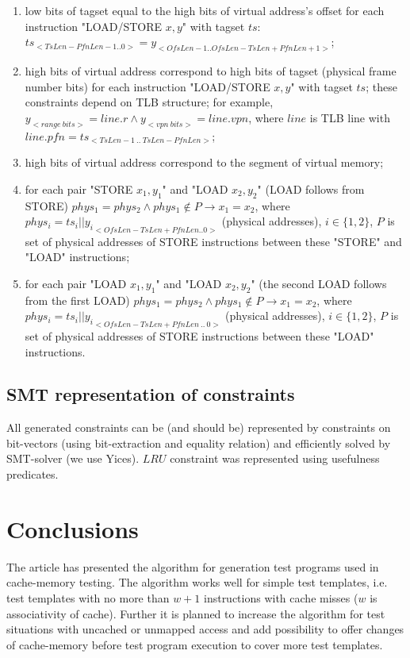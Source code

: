 \documentclass[times, 10pt,twocolumn]{article}
\begin{document}
\begin{enumerate}

\item low bits of tagset equal to the high bits of virtual address's offset for each
instruction "LOAD/STORE $x, y$" with tagset $ts$:
$ts_{<TsLen-PfnLen-1..0>} = y_{<OfsLen-1..OfsLen-TsLen+PfnLen+1>}$;

\item high bits of virtual address correspond to high bits of tagset
(physical frame number bits) for each instruction "LOAD/STORE $x,
y$" with tagset $ts$; these constraints depend on TLB structure; for
example, $y_{<range~bits>} = line.r \wedge y_{<vpn~bits>} =
line.vpn$, where $line$ is TLB line with $line.pfn =
ts_{<TsLen-1~..~TsLen-PfnLen>}$;

\item high bits of virtual address correspond to the segment of virtual memory;

\item for each pair "STORE $x_1, y_1$"
and "LOAD $x_2, y_2$" (LOAD follows from STORE) $phys_1 = phys_2
\wedge phys_1 \notin P \rightarrow x_1 = x_2$, where $phys_i = ts_i
|| {y_i}_{<OfsLen-TsLen+PfnLen..0>}$ (physical addresses), $i \in
\{1, 2\}$, $P$ is set of physical addresses of STORE instructions
between these "STORE" and "LOAD" instructions;

\item for each pair "LOAD
$x_1, y_1$" and "LOAD $x_2, y_2$" (the second LOAD follows from the
first LOAD) $phys_1 = phys_2 \wedge phys_1 \notin P \rightarrow x_1
= x_2$, where $phys_i = ts_i || {y_i}_{<OfsLen-TsLen+PfnLen~..~0>}$
(physical addresses), $i \in \{1, 2\}$, $P$ is set of physical
addresses of STORE instructions between these "LOAD" instructions.
\end{enumerate}

\subsection{SMT representation of constraints}
All generated constraints can be (and should be) represented by constraints on bit-vectors (using bit-extraction and equality relation) and efficiently solved by SMT-solver (we use Yices). $LRU$ constraint was represented using usefulness predicates.

\section{Conclusions}
The article has presented the algorithm for generation test programs used in cache-memory testing. The algorithm works well for simple test templates, i.e. test templates with no more than $w+1$ instructions with cache misses ($w$ is associativity of cache). Further it is planned to increase the algorithm for test situations with uncached or unmapped access and add possibility to offer changes of cache-memory before test program execution to cover more test templates.




\end{document}
